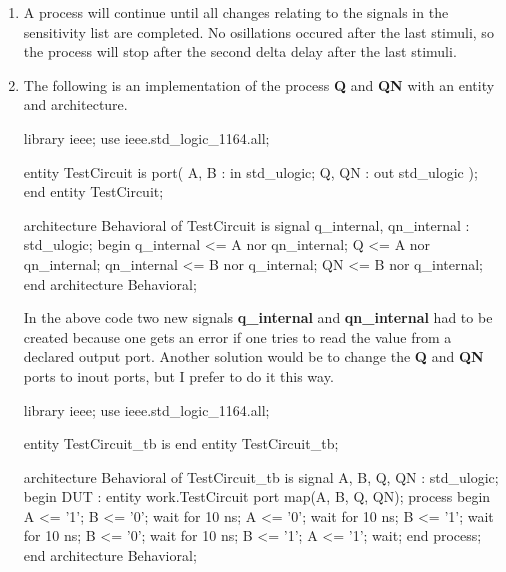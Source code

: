 \documentclass[a4paper,11pt,norsk]{article}
\begin{document}
\begin{enumerate}
\item A process will continue until all changes relating to the signals in the sensitivity list are completed. No osillations occured after the last stimuli, 
    so the process will stop after the second delta delay after the last stimuli.

\item The following is an implementation of the process \textbf{Q} and \textbf{QN} with an entity and architecture.
\begin{vhdlcode}
library ieee;
use ieee.std_logic_1164.all;

entity TestCircuit is 
    port(
        A, B : in std_ulogic;
        Q, QN : out std_ulogic
    );
end entity TestCircuit;

architecture Behavioral of TestCircuit is
    signal q_internal, qn_internal : std_ulogic;
begin
    q_internal <= A nor qn_internal;
    Q <= A nor qn_internal;
    qn_internal <= B nor q_internal;
    QN <= B nor q_internal;
end architecture Behavioral;
\end{vhdlcode}
In the above code two new signals \textbf{q\_internal} and \textbf{qn\_internal} had to be created 
because one gets an error if one tries to read the value from a declared output port. Another 
solution would be to change the \textbf{Q} and \textbf{QN} ports to inout ports, but I prefer to 
do it this way.

\begin{vhdlcode}
library ieee;
use ieee.std_logic_1164.all;

entity TestCircuit_tb is
end entity TestCircuit_tb;

architecture Behavioral of TestCircuit_tb is
    signal A, B, Q, QN : std_ulogic;
begin
    DUT : entity work.TestCircuit port map(A, B, Q, QN);
    process begin
        A <= '1'; B <= '0';
        wait for 10 ns;
        A <= '0';
        wait for 10 ns;
        B <= '1';
        wait for 10 ns;
        B <= '0';
        wait for 10 ns;
        B <= '1'; A <= '1';
        wait;
    end process;
end architecture Behavioral;
\end{vhdlcode}
\end{enumerate}
\end{document}
